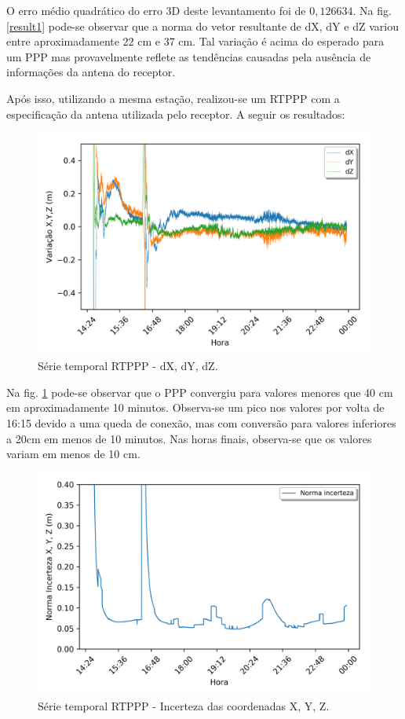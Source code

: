 O erro médio quadrático do erro 3D deste levantamento foi de $0,126634$. Na fig. \ref{result1} pode-se observar que a norma do vetor resultante de dX, dY e dZ variou entre aproximadamente 22 cm e 37 cm. Tal variação é acima do esperado para um PPP mas provavelmente reflete as tendências causadas pela ausência de informações da antena do receptor.

Após isso, utilizando a mesma estação, realizou-se um RTPPP com a especificação da antena utilizada pelo receptor. A seguir os resultados:

\begin{figure}[H]
\centering
\includegraphics[scale=0.9]{data/Graphics/POAL20650/POAL20650_graphic_xyz.png}
\caption{Série temporal RTPPP - dX, dY, dZ.}
\label{rtppp2}
\end{figure}

Na fig. \ref{rtppp2} pode-se observar que o PPP convergiu para valores menores que 40 cm em aproximadamente 10 minutos. Observa-se um pico nos valores por volta de 16:15 devido a uma queda de conexão, mas com conversão para valores inferiores a 20cm em menos de 10 minutos. Nas horas finais, observa-se que os valores variam em menos de 10 cm.

\begin{figure}[H]
\centering
\includegraphics[scale=0.9]{data/Graphics/POAL20650/POAL20650_graphic_uncertainty.png}
\caption{Série temporal RTPPP - Incerteza das coordenadas X, Y, Z.}
\label{incert2}
\end{figure}

